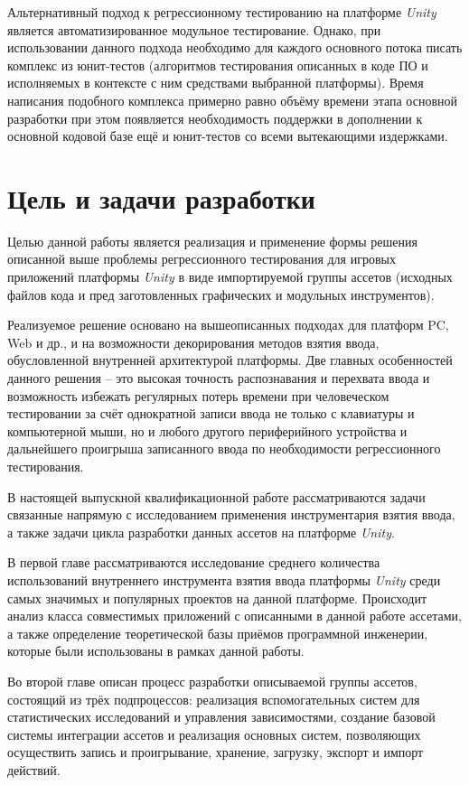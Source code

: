 Альтернативный подход к регрессионному тестированию на платформе \textit{Unity} является автоматизированное модульное тестирование. Однако, при использовании данного подхода необходимо для каждого основного потока писать комплекс из юнит-тестов (алгоритмов тестирования описанных в коде ПО и исполняемых в контексте с ним средствами выбранной платформы). Время написания подобного комплекса примерно равно объёму времени этапа основной разработки при этом появляется необходимость поддержки в дополнении к основной кодовой базе ещё и юнит-тестов со всеми вытекающими издержками.

\section*{Цель и задачи разработки}
Целью данной работы является реализация и применение формы решения описанной выше проблемы регрессионного тестирования для игровых приложений платформы \textit{Unity} в виде импортируемой группы ассетов (исходных файлов кода и пред заготовленных графических и модульных инструментов). 

Реализуемое решение основано на вышеописанных подходах для платформ PC, Web и др., и на возможности декорирования методов взятия ввода, обусловленной внутренней архитектурой платформы. Две главных особенностей данного решения -- это высокая точность распознавания и перехвата ввода и возможность избежать регулярных потерь времени при человеческом тестировании за счёт однократной записи ввода не только с клавиатуры и компьютерной мыши, но и любого другого периферийного устройства и дальнейшего проигрыша записанного ввода по необходимости регрессионного тестирования.

В настоящей выпускной квалификационной работе рассматриваются задачи связанные напрямую с исследованием применения инструментария взятия ввода, а также задачи цикла разработки данных ассетов на платформе \textit{Unity}.

В первой главе рассматриваются исследование среднего количества использований внутреннего инструмента взятия ввода платформы \textit{Unity} среди самых значимых и популярных проектов на данной платформе. Происходит анализ класса совместимых приложений с описанными в данной работе ассетами, а также определение теоретической базы приёмов программной инженерии, которые были использованы в рамках данной работы.

Во второй главе описан процесс разработки описываемой группы ассетов, состоящий из трёх подпроцессов: реализация вспомогательных систем для статистических исследований и управления зависимостями, создание базовой системы интеграции ассетов и реализация основных систем, позволяющих осуществить запись и проигрывание, хранение, загрузку, экспорт и импорт действий.

